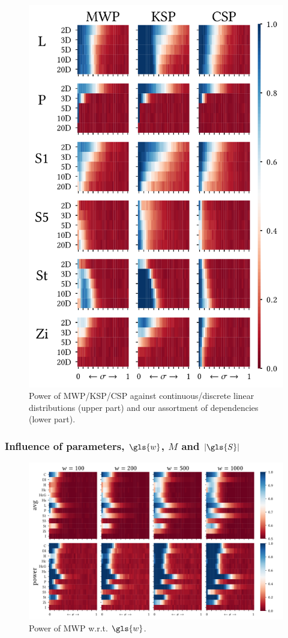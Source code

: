 \begin{figure}
    \hfill
    \includegraphics[width=0.49\linewidth, trim=0 0.25cm 0 0.25cm]{part2-figures/power_2_thesis-compressed.pdf}
    \hfill
    \caption{Power of \gls{MWP}/\gls{KSP}/\gls{CSP} against continuous/discrete linear distributions (upper part) and our assortment of dependencies (lower part).}
    \label{fig:power}
\end{figure} 

\subsubsection{Influence of parameters, $\gls{w}$, $M$ and $|\gls{S}|$}

\begin{figure}
	\centering
	\includegraphics[width=\linewidth, trim=0 0.5cm 0 0.5cm]{part2-figures/Fig5_1-2_thesis-compressed.pdf}
	\caption{Power of \gls{MWP} w.r.t. $\gls{w}$.}
	\label{fig:N_MWP}
\end{figure}

